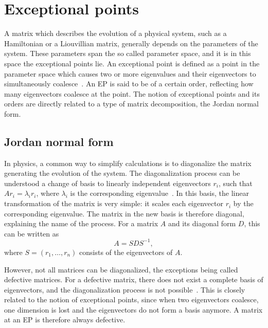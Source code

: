 \documentclass[../main.tex]{subfiles}
\begin{document}

\section{Exceptional points}\label{sec:ep}
A matrix which describes the evolution of a physical system, such as a Hamiltonian or a Liouvillian matrix, generally depends on the parameters of the system. These parameters span the so called parameter space, and it is in this space the exceptional points lie. An exceptional point is defined as a point in the parameter space which causes two or more eigenvalues and their eigenvectors to simultaneously coalesce~\cite{nonHermrev}. An EP is said to be of a certain order, reflecting how many eigenvectors coalesce at the point. The notion of exceptional points and its orders are directly related to a type of matrix decomposition, the Jordan normal form.

\subsection{Jordan normal form}\label{sec:jordan}

In physics, a common way to simplify calculations is to diagonalize the matrix generating the evolution of the system. The diagonalization process can be understood a change of basis to linearly independent eigenvectors $r_i$, such that $Ar_i=\lambda_ir_i$, where $\lambda_i$ is the corresponding eigenvalue~\cite{uffe}. In this basis, the linear transformation of the matrix is very simple: it scales each eigenvector $r_i$ by the corresponding eigenvalue. The matrix in the new basis is therefore diagonal, explaining the name of the process. For a matrix $A$ and its diagonal form $D$, this can be written as 
\begin{equation}
    A = SDS^{-1},
\end{equation}
where $S = (r_1, \dots ,r_n)$ consists of the eigenvectors of $A$.

However, not all matrices can be diagonalized, the exceptions being called defective matrices. For a defective matrix, there does not exist a complete basis of eigenvectors, and the diagonalization process is not possible~\cite{uffe}. This is closely related to the notion of exceptional points, since when two eigenvectors coalesce, one dimension is lost and the eigenvectors do not form a basis anymore. A matrix at an EP is therefore always defective.
\end{document}
